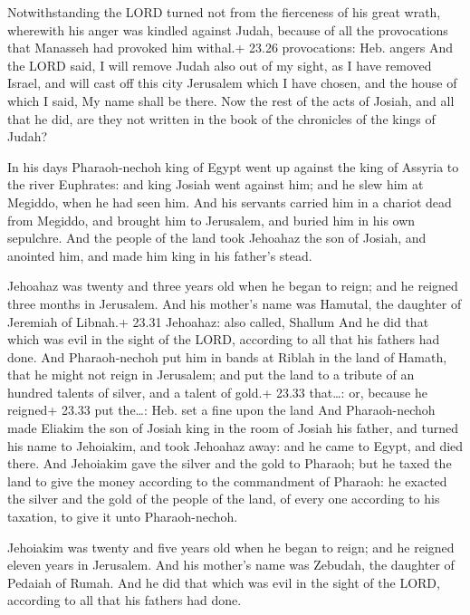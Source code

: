  Notwithstanding the LORD turned not from the fierceness
of his great wrath, wherewith his anger was kindled against Judah,
because of all the provocations that Manasseh had provoked him withal.+
23.26 provocations: Heb. angers  And the LORD said, I will
remove Judah also out of my sight, as I have removed Israel, and will
cast off this city Jerusalem which I have chosen, and the house of which
I said, My name shall be there.  Now the rest of the acts
of Josiah, and all that he did, are they not written in the book of the
chronicles of the kings of Judah?

 In his days Pharaoh-nechoh king of Egypt went up against
the king of Assyria to the river Euphrates: and king Josiah went against
him; and he slew him at Megiddo, when he had seen him.  And
his servants carried him in a chariot dead from Megiddo, and brought him
to Jerusalem, and buried him in his own sepulchre. And the people of the
land took Jehoahaz the son of Josiah, and anointed him, and made him
king in his father's stead.

 Jehoahaz was twenty and three years old when he began to
reign; and he reigned three months in Jerusalem. And his mother's name
was Hamutal, the daughter of Jeremiah of Libnah.+ 23.31 Jehoahaz: also
called, Shallum  And he did that which was evil in the
sight of the LORD, according to all that his fathers had done.
 And Pharaoh-nechoh put him in bands at Riblah in the land
of Hamath, that he might not reign in Jerusalem; and put the land to a
tribute of an hundred talents of silver, and a talent of gold.+ 23.33
that\ldots: or, because he reigned+ 23.33 put the\ldots: Heb. set a fine
upon the land  And Pharaoh-nechoh made Eliakim the son of
Josiah king in the room of Josiah his father, and turned his name to
Jehoiakim, and took Jehoahaz away: and he came to Egypt, and died there.
 And Jehoiakim gave the silver and the gold to Pharaoh; but
he taxed the land to give the money according to the commandment of
Pharaoh: he exacted the silver and the gold of the people of the land,
of every one according to his taxation, to give it unto Pharaoh-nechoh.

 Jehoiakim was twenty and five years old when he began to
reign; and he reigned eleven years in Jerusalem. And his mother's name
was Zebudah, the daughter of Pedaiah of Rumah.  And he did
that which was evil in the sight of the LORD, according to all that his
fathers had done.

